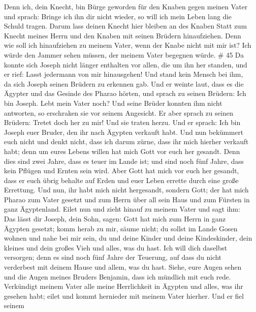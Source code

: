 Denn ich, dein Knecht, bin Bürge geworden für den Knaben
gegen meinen Vater und sprach: Bringe ich ihn dir nicht wieder, so will
ich mein Leben lang die Schuld tragen.  Darum lass deinen
Knecht hier bleiben an des Knaben Statt zum Knecht meines Herrn und den
Knaben mit seinen Brüdern hinaufziehen.  Denn wie soll ich
hinaufziehen zu meinem Vater, wenn der Knabe nicht mit mir ist? Ich
würde den Jammer sehen müssen, der meinem Vater begegnen würde. \# 45
 Da konnte sich Joseph nicht länger enthalten vor allen, die
um ihn her standen, und er rief: Lasst jedermann von mir hinausgehen!
Und stand kein Mensch bei ihm, da sich Joseph seinen Brüdern zu erkennen
gab.  Und er weinte laut, dass es die Ägypter und das
Gesinde des Pharao hörten,  und sprach zu seinen Brüdern:
Ich bin Joseph. Lebt mein Vater noch? Und seine Brüder konnten ihm nicht
antworten, so erschraken sie vor seinem Angesicht.  Er aber
sprach zu seinen Brüdern: Tretet doch her zu mir! Und sie traten herzu.
Und er sprach: Ich bin Joseph euer Bruder, den ihr nach Ägypten verkauft
habt.  Und nun bekümmert euch nicht und denkt nicht, dass
ich darum zürne, dass ihr mich hierher verkauft habt; denn um eures
Lebens willen hat mich Gott vor euch her gesandt.  Denn dies
sind zwei Jahre, dass es teuer im Lande ist; und sind noch fünf Jahre,
dass kein Pflügen und Ernten sein wird.  Aber Gott hat mich
vor euch her gesandt, dass er euch übrig behalte auf Erden und euer
Leben errette durch eine große Errettung.  Und nun, ihr habt
mich nicht hergesandt, sondern Gott; der hat mich Pharao zum Vater
gesetzt und zum Herrn über all sein Haus und zum Fürsten in ganz
Ägyptenland.  Eilet nun und zieht hinauf zu meinem Vater und
sagt ihm: Das lässt dir Joseph, dein Sohn, sagen: Gott hat mich zum
Herrn in ganz Ägypten gesetzt; komm herab zu mir, säume nicht;
 du sollst im Lande Gosen wohnen und nahe bei mir sein, du
und deine Kinder und deine Kindeskinder, dein kleines und dein großes
Vieh und alles, was du hast.  Ich will dich daselbst
versorgen; denn es sind noch fünf Jahre der Teuerung, auf dass du nicht
verderbest mit deinem Hause und allem, was du hast.  Siehe,
eure Augen sehen und die Augen meines Bruders Benjamin, dass ich
mündlich mit euch rede.  Verkündigt meinem Vater alle meine
Herrlichkeit in Ägypten und alles, was ihr gesehen habt; eilet und kommt
hernieder mit meinem Vater hierher.  Und er fiel seinem
